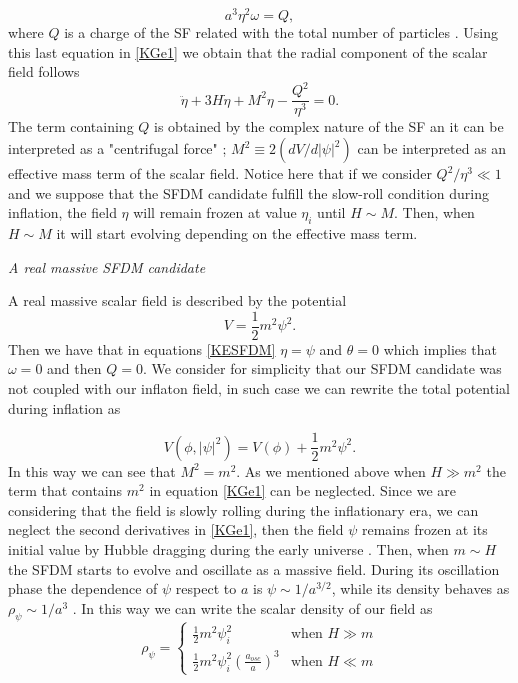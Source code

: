 \documentclass[amssymb,twocolumn,prd,nofootinbib,showpacs]{revtex4-1}
\begin{document}
\begin{equation}
a^3\eta^2\omega=Q,
\end{equation}
where $Q$ is a charge of the SF related with the total number of particles \cite{SFphi42,charge1,SFphi41,charge3,charge4}. Using this last equation in \eqref{KGe1} we obtain
that the radial component of the scalar field follows
\begin{equation}\label{KGe3}
\ddot\eta+3H\dot\eta+M^2\eta-\frac{Q^2}{\eta^3}= 0.
\end{equation}
The term containing $Q$ is obtained by the complex nature of the SF \cite{SFphi42} an it can be interpreted as a "centrifugal force" \cite{charge4}; $M^2\equiv 2(dV/d|\psi|^2)$ can be interpreted as an effective mass term of the scalar field. Notice here that if we consider $Q^2/\eta^3\ll 1$ and we suppose that the SFDM candidate fulfill the slow-roll condition during inflation, the field $\eta$ will remain frozen at value $\eta_i$ until $H\sim M$. Then, when $H\sim M$ it will start evolving depending on the effective mass term.
\begin{center}
\textit{A real massive SFDM candidate}
\end{center}

A real massive scalar field is described by the potential 
\begin{equation}
V = \frac{1}{2}m^2\psi^2.
\end{equation}
Then we have that in equations \eqref{KESFDM} $\eta=\psi$ and $\theta=0$ which implies that $\omega=0$ and then $Q = 0$. We consider for simplicity that our SFDM candidate was not coupled with our inflaton field, in such case we can rewrite the total potential during inflation as

\begin{equation}\label{potential_massive}
V(\phi,|\psi|^2)=V(\phi)+\frac{1}{2}m^2\psi^2.
\end{equation}
In this way we can see that $M^2=m^2$. As we mentioned above when $H\gg m^2$ the term that contains $m^2$ in equation \eqref{KGe1} can be neglected. Since we are considering that the field is slowly rolling during the inflationary era, we can neglect the second derivatives in \eqref{KGe1}, then the field $\psi$ remains frozen at its initial value by Hubble dragging during the early universe \cite{curvatonatractor}. Then, when $m\sim H$ the SFDM starts to evolve and oscillate as a massive field. During its oscillation phase the dependence of $\psi$ respect to $a$ is $\psi\sim 1/a^{3/2}$, while its density behaves as $\rho_{\psi}\sim 1/a^3$  \cite{SFphi41,SFphi42}. In this way we can write the scalar density of our field as
\begin{equation}\label{rhosfdm}
\rho_\psi = \left\lbrace\begin{array}{ll}
\frac{1}{2}m^2\psi_i^2 & \text{when }H\gg m \\
\frac{1}{2}m^2\psi_i^2\left(\frac{a_{osc}}{a}\right)^3 & \text{when }H\ll m
\end{array}\right .
\end{equation}
\end{document}
